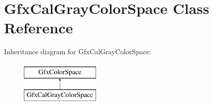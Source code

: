 \hypertarget{class_gfx_cal_gray_color_space}{}\section{Gfx\+Cal\+Gray\+Color\+Space Class Reference}
\label{class_gfx_cal_gray_color_space}
Inheritance diagram for Gfx\+Cal\+Gray\+Color\+Space\+:\begin{figure}[H]
\begin{center}
\leavevmode
\includegraphics[height=2.000000cm]{class_gfx_cal_gray_color_space}
\end{center}
\end{figure}
